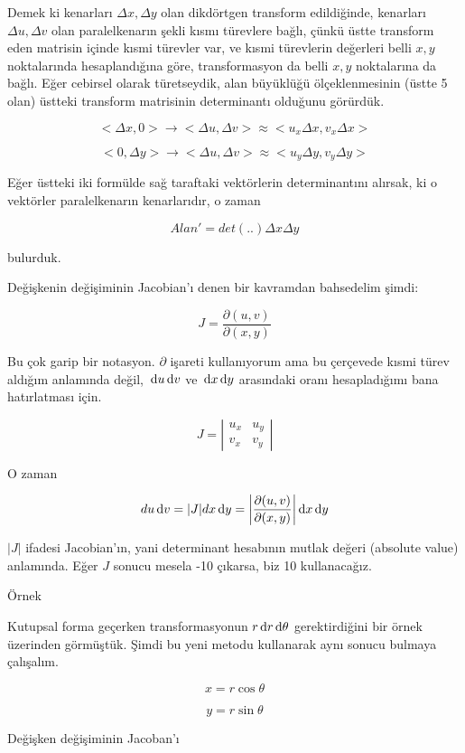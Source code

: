 \documentclass[12pt,fleqn]{article}\usepackage{../../common}
\begin{document}
Demek ki kenarları $\Delta x,\Delta y$ olan dikdörtgen transform
edildiğinde, kenarları $\Delta u,\Delta v$ olan paralelkenarın şekli kısmı
türevlere bağlı, çünkü üstte transform eden matrisin içinde kısmi türevler
var, ve kısmi türevlerin değerleri belli $x,y$ noktalarında hesaplandığına
göre, transformasyon da belli $x,y$ noktalarına da bağlı. Eğer cebirsel
olarak türetseydik, alan büyüklüğü ölçeklenmesinin (üstte 5 olan) üstteki
transform matrisinin determinantı olduğunu görürdük. 


$$< \Delta x,0 > \to < \Delta u, \Delta v > \approx < u_x \Delta x, v_x\Delta x > $$

$$ < 0, \Delta y > \to < \Delta u,\Delta v > \approx < u_y\Delta y,v_y \Delta y > $$

Eğer üstteki iki formülde sağ taraftaki vektörlerin determinantını alırsak,
ki o vektörler paralelkenarın kenarlarıdır, o zaman 

$$ Alan' =  det(..)\Delta x \Delta y  $$

bulurduk. 

Değişkenin değişiminin Jacobian'ı denen bir kavramdan bahsedelim şimdi: 

$$ J = \frac{\partial (u,v)}{\partial(x,y)} $$

Bu çok garip bir notasyon. $\partial$ işareti kullanıyorum ama bu çerçevede
kısmi türev aldığım anlamında değil, $\,\mathrm{d} u \,\mathrm{d} v$ ve $\,\mathrm{d} x \,\mathrm{d} y$ arasındaki
oranı hesapladığımı bana hatırlatması için.

$$ J =  \left|\begin{array}{rr}
u_x & u_y \\
v_x & v_y
\end{array}\right|
$$

O zaman 

$$ du \,\mathrm{d} v = |J| dx \,\mathrm{d} y =
\bigg|\frac{\partial (u,v)}{\partial(x,y)}\bigg |
\,\mathrm{d} x \,\mathrm{d} y
$$

$|J|$ ifadesi Jacobian'ın, yani determinant hesabının mutlak değeri (absolute
value) anlamında. Eğer $J$ sonucu mesela -10 çıkarsa, biz 10 kullanacağız.

Örnek 

Kutupsal forma geçerken transformasyonun $r \,\mathrm{d} r \,\mathrm{d} \theta$ gerektirdiğini
bir örnek üzerinden görmüştük. Şimdi bu yeni metodu kullanarak aynı sonucu
bulmaya çalışalım. 

$$  x= r \cos \theta $$

$$  y= r \sin\theta $$

Değişken değişiminin Jacoban'ı
\end{document}

